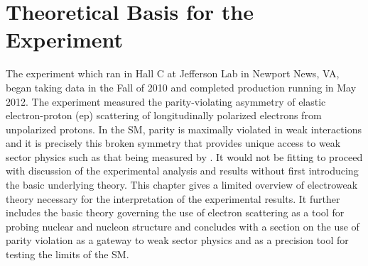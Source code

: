 
\chapter{Theoretical Basis for the \Qs Experiment} 
\captionsetup{justification=justified,singlelinecheck=false}

\label{Chapter2} 



The \Qs experiment which ran in Hall C at Jefferson Lab in Newport News, VA, began taking data in the Fall of 2010 and completed production running in May 2012. The experiment measured the parity-violating asymmetry of elastic electron-proton (ep) scattering of longitudinally polarized electrons from unpolarized protons. In the SM, parity is maximally violated  in weak interactions and it is precisely this broken symmetry that provides unique access to weak sector physics such as that being measured by \Q. It would not be fitting to proceed with discussion of the experimental analysis and results without first introducing the basic underlying theory. This chapter gives a limited overview of electroweak theory necessary for the interpretation of the \Qs experimental results. It further includes the basic theory governing the use of electron scattering as a tool for probing nuclear and nucleon structure and concludes with a section on the use of parity violation as a gateway to weak sector physics and as a precision tool for testing the limits of the SM.

